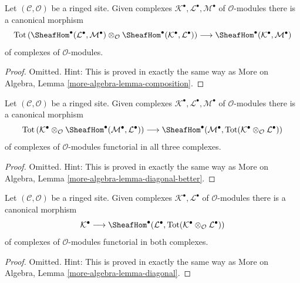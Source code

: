 \begin{lemma}
\label{lemma-composition}
Let $(\mathcal{C}, \mathcal{O})$ be a ringed site. Given complexes
$\mathcal{K}^\bullet, \mathcal{L}^\bullet, \mathcal{M}^\bullet$
of $\mathcal{O}$-modules there is a canonical morphism
$$
\text{Tot}\left(
\SheafHom^\bullet(\mathcal{L}^\bullet, \mathcal{M}^\bullet)
\otimes_\mathcal{O}
\SheafHom^\bullet(\mathcal{K}^\bullet, \mathcal{L}^\bullet)
\right)
\longrightarrow
\SheafHom^\bullet(\mathcal{K}^\bullet, \mathcal{M}^\bullet)
$$
of complexes of $\mathcal{O}$-modules.
\end{lemma}

\begin{proof}
Omitted. Hint: This is proved in exactly the same way as
More on Algebra, Lemma \ref{more-algebra-lemma-composition}.
\end{proof}

\begin{lemma}
\label{lemma-diagonal-better}
Let $(\mathcal{C}, \mathcal{O})$ be a ringed site. Given complexes
$\mathcal{K}^\bullet, \mathcal{L}^\bullet, \mathcal{M}^\bullet$
of $\mathcal{O}$-modules there is a canonical morphism
$$
\text{Tot}\left(
\mathcal{K}^\bullet \otimes_\mathcal{O}
\SheafHom^\bullet(\mathcal{M}^\bullet, \mathcal{L}^\bullet)
\right)
\longrightarrow
\SheafHom^\bullet(\mathcal{M}^\bullet,
\text{Tot}(\mathcal{K}^\bullet \otimes_\mathcal{O} \mathcal{L}^\bullet))
$$
of complexes of $\mathcal{O}$-modules functorial in all three complexes.
\end{lemma}

\begin{proof}
Omitted. Hint: This is proved in exactly the same way as
More on Algebra, Lemma \ref{more-algebra-lemma-diagonal-better}.
\end{proof}

\begin{lemma}
\label{lemma-diagonal}
Let $(\mathcal{C}, \mathcal{O})$ be a ringed site. Given complexes
$\mathcal{K}^\bullet, \mathcal{L}^\bullet$
of $\mathcal{O}$-modules there is a canonical morphism
$$
\mathcal{K}^\bullet
\longrightarrow
\SheafHom^\bullet(\mathcal{L}^\bullet,
\text{Tot}(\mathcal{K}^\bullet \otimes_\mathcal{O} \mathcal{L}^\bullet))
$$
of complexes of $\mathcal{O}$-modules functorial in both complexes.
\end{lemma}

\begin{proof}
Omitted. Hint: This is proved in exactly the same way as
More on Algebra, Lemma \ref{more-algebra-lemma-diagonal}.
\end{proof}

